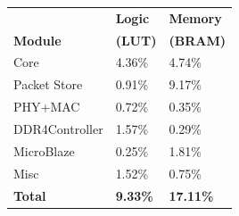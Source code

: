 {
\begin{figure}[th]
\begin{minipage}{\figWidthSix}
\begin{center}
\scriptsize
\begin{tabular}{ p{0.6in} | p{0.2in} |p{0.27in} }

 & \textbf{Logic} & \textbf{Memory} \\
\textbf{Module} & \textbf{(LUT)} & \textbf{(BRAM)} \\
\hline
\hline
\snic{} Core & 4.36\%   & 4.74\% \\
Packet Store & 0.91\%   & 9.17\% \\
PHY+MAC      & 0.72\%   & 0.35\% \\
DDR4Controller         & 1.57\%   & 0.29\% \\
MicroBlaze   & 0.25\%   & 1.81\% \\
Misc         & 1.52\%   & 0.75\% \\
\hline
\textbf{Total}        & \textbf{9.33\%}   & \textbf{17.11\%} \\


\end{tabular}
\end{center}
\end{minipage}
\end{figure}}
